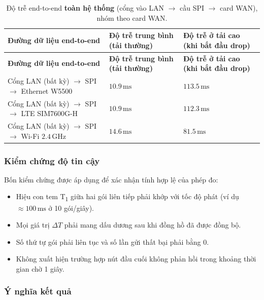 \begin{longtable}{|p{5.5cm}|p{4cm}|p{4cm}|}
    \caption{Độ trễ end-to-end \textbf{toàn hệ thống} (cổng vào LAN $\rightarrow$ cầu SPI $\rightarrow$ card WAN), nhóm theo card WAN.}
    \label{tab:e2e_results} \\
    \hline
    \textbf{Đường dữ liệu end-to-end} & \textbf{Độ trễ trung bình} \newline \textbf{(tải thường)} & \textbf{Độ trễ ở tải cao} \newline \textbf{(khi bắt đầu drop)} \\ \hline
    \endfirsthead
    \hline
    \textbf{Đường dữ liệu end-to-end} & \textbf{Độ trễ trung bình} \newline \textbf{(tải thường)} & \textbf{Độ trễ ở tải cao} \newline \textbf{(khi bắt đầu drop)} \\ \hline
    \endhead
    \hline
    \endfoot
    \endlastfoot
    Cổng LAN (bất kỳ) $\rightarrow$ SPI $\rightarrow$ Ethernet W5500 & $10{.}9\,\text{ms}$ & $113{.}5\,\text{ms}$ \\ \hline
    Cổng LAN (bất kỳ) $\rightarrow$ SPI $\rightarrow$ LTE SIM7600G-H & $10{.}9\,\text{ms}$ & $112{.}3\,\text{ms}$ \\ \hline
    Cổng LAN (bất kỳ) $\rightarrow$ SPI $\rightarrow$ Wi-Fi $2{.}4\,\text{GHz}$ & $14{.}6\,\text{ms}$ & $81{.}5\,\text{ms}$ \\ \hline
\end{longtable}

\subsubsection{Kiểm chứng độ tin cậy}

Bốn kiểm chứng được áp dụng để xác nhận tính hợp lệ của phép đo:
\begin{itemize}
    \item Hiệu con tem T\textsubscript{1} giữa hai gói liên tiếp phải khớp với tốc độ phát (ví dụ $\approx 100\,\text{ms}$ ở 10 gói/giây).
    \item Mọi giá trị $\Delta T$ phải mang dấu dương sau khi đồng hồ đã được đồng bộ.
    \item Số thứ tự gói phải liên tục và số lần gửi thất bại phải bằng 0.
    \item Không xuất hiện trường hợp nút đầu cuối không phản hồi trong khoảng thời gian chờ 1 giây.
\end{itemize}

\subsubsection{Ý nghĩa kết quả}

